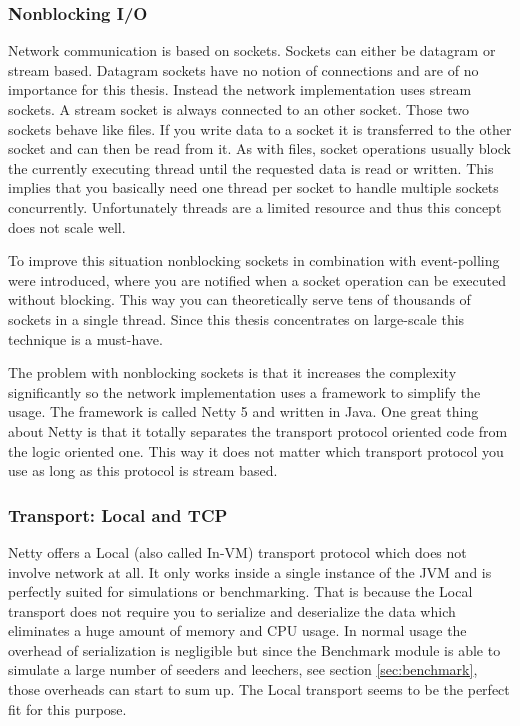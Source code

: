 \subsubsection{Nonblocking I/O}
Network communication is based on sockets. Sockets can either be datagram or stream based. Datagram sockets have no notion of connections and are of no importance for this thesis. Instead the network implementation uses stream sockets. A stream socket is always connected to an other socket. Those two sockets behave like files. If you write data to a socket it is transferred to the other socket and can then be read from it. As with files, socket operations usually block the currently executing thread until the requested data is read or written. This implies that you basically need one thread per socket to handle multiple sockets concurrently. Unfortunately threads are a limited resource and thus this concept does not scale well. 

To improve this situation nonblocking sockets in combination with event-polling were introduced, where you are notified when a socket operation can be executed without blocking. This way you can theoretically serve tens of thousands of sockets in a single thread. Since this thesis concentrates on large-scale this technique is a must-have.

The problem with nonblocking sockets is that it increases the complexity significantly so the network implementation uses a framework to simplify the usage. The framework is called Netty 5 and written in Java. One great thing about Netty is that it totally separates the transport protocol oriented code from the logic oriented one. This way it does not matter which transport protocol you use as long as this protocol is stream based.


\subsubsection{Transport: Local and TCP}
Netty offers a Local (also called In-VM) transport protocol which does not involve network at all. It only works inside a single instance of the JVM and is perfectly suited for simulations or benchmarking. That is because the Local transport does not require you to serialize and deserialize the data which eliminates a huge amount of memory and CPU usage. In normal usage the overhead of serialization is negligible but since the Benchmark module is able to simulate a large number of seeders and leechers, see section \ref{sec:benchmark}, those overheads can start to sum up. The Local transport seems to be the perfect fit for this purpose.

